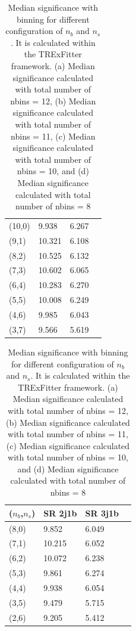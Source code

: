 \begin{table}[!h]
\begin{minipage}{.37\textwidth}
\begin{tabular}{@{} *4l @{}}
\midrule
      (10,0) & 9.938 & 6.267 \\[0.2ex] 
      (9,1) & 10.321 & 6.108 \\[0.2ex] 
      (8,2) & 10.525 & 6.132 \\[0.2ex] 
      (7,3) & 10.602 & 6.065 \\[0.2ex] 
      (6,4) & 10.283 & 6.270 \\[0.2ex] 
      (5,5) & 10.008 & 6.249 \\[0.2ex] 
      (4,6) & 9.985 & 6.043 \\[0.2ex] 
      (3,7) & 9.566 & 5.619 \\[0.2ex] 
\bottomrule
\end{tabular}
\caption*{(c)}
\end{minipage} 
\begin{minipage}{.37\textwidth}
\begin{tabular}{@{} *4l @{}}
 \toprule
 ($n_{b}$,$n_{s}$) & SR 2j1b & SR 3j1b \\[0.2ex] 
\midrule
      (8,0) & 9.852 & 6.049 \\[0.2ex]
      (7,1) & 10.215 & 6.052 \\[0.2ex]
      (6,2) & 10.072 & 6.238 \\[0.2ex]
      (5,3) & 9.861 & 6.274 \\[0.2ex]
      (4,4) & 9.938 & 6.054 \\[0.2ex]
      (3,5) & 9.479  & 5.715 \\[0.2ex]
      (2,6) & 9.205 &  5.412 \\[0.2ex]
\bottomrule
\end{tabular} 
\caption*{(d)}
\end{minipage} 
\caption{Median significance with binning for different configuration of $n_{b}$ and $n_{s}$. It is calculated within the TRExFitter framework. (a) Median significance calculated with total number of nbins = 12, (b)  Median significance calculated with total number of nbins = 11, (c)  Median significance calculated with total number of nbins = 10, and (d)  Median significance calculated with total number of nbins = 8}
\label{tab:binningoptimization}
\end{table}

